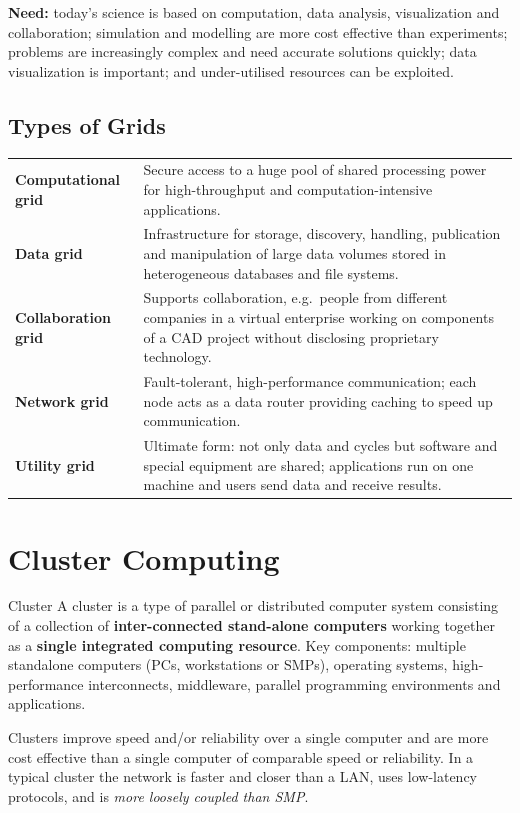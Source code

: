 \documentclass[11pt,a4paper,openany]{report}
\begin{document}
\textbf{Need:} today's science is based on computation, data analysis, visualization and
collaboration; simulation and modelling are more cost effective than experiments; problems are
increasingly complex and need accurate solutions quickly; data visualization is important; and
under-utilised resources can be exploited.

\subsection{Types of Grids}
\begin{center}
\begin{tabularx}{\textwidth}{>{\bfseries}lX}
\toprule
Computational grid & Secure access to a huge pool of shared processing power for
high-throughput and computation-intensive applications.\\
Data grid & Infrastructure for storage, discovery, handling, publication and manipulation of
large data volumes stored in heterogeneous databases and file systems.\\
Collaboration grid & Supports collaboration, e.g.\ people from different companies in a virtual
enterprise working on components of a CAD project without disclosing proprietary technology.\\
Network grid & Fault-tolerant, high-performance communication; each node acts as a data router
providing caching to speed up communication.\\
Utility grid & Ultimate form: not only data and cycles but software and special equipment are
shared; applications run on one machine and users send data and receive results.\\
\bottomrule
\end{tabularx}
\end{center}

\section{Cluster Computing}
\begin{defbox}{Cluster}
A cluster is a type of parallel or distributed computer system consisting of a collection of
\textbf{inter-connected stand-alone computers} working together as a \textbf{single integrated
computing resource}. Key components: multiple standalone computers (PCs, workstations or SMPs),
operating systems, high-performance interconnects, middleware, parallel programming environments
and applications.
\end{defbox}
Clusters improve speed and/or reliability over a single computer and are more cost effective than
a single computer of comparable speed or reliability. In a typical cluster the network is faster
and closer than a LAN, uses low-latency protocols, and is \emph{more loosely coupled than SMP}.
\end{document}
